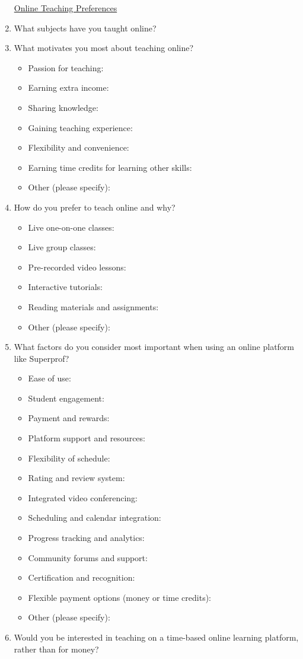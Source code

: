 \begin{enumerate}
    \underline{Online Teaching Preferences}
    \item What subjects have you taught online?

    \item What motivates you most about teaching online?
    \begin{itemize}
        \item Passion for teaching:
        \item Earning extra income:
        \item Sharing knowledge:
        \item Gaining teaching experience:
        \item Flexibility and convenience:
        \item Earning time credits for learning other skills:
        \item Other (please specify):
    \end{itemize}

    \item How do you prefer to teach online and why?
    \begin{itemize}
        \item Live one-on-one classes:
        \item Live group classes:
        \item Pre-recorded video lessons:
        \item Interactive tutorials:
        \item Reading materials and assignments:
        \item Other (please specify):
    \end{itemize}

    \item What factors do you consider most important when using an online platform like Superprof?
    \begin{itemize}
        \item Ease of use:
        \item Student engagement:
        \item Payment and rewards:
        \item Platform support and resources:
        \item Flexibility of schedule:
        \item Rating and review system:
        \item Integrated video conferencing:
        \item Scheduling and calendar integration:
        \item Progress tracking and analytics:
        \item Community forums and support:
        \item Certification and recognition:
        \item Flexible payment options (money or time credits):
        \item Other (please specify):
    \end{itemize}
    \item Would you be interested in teaching on a time-based online learning platform, rather than for money?


\end{enumerate}
